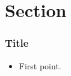 \documentclass[presentation,aspectratio=43,10pt]{beamer}
\begin{document}
\section{Section}

\begin{frame}
  \frametitle{Title}

\begin{itemize}
  \item First point.
\end{itemize}

\end{frame}
\end{document}
